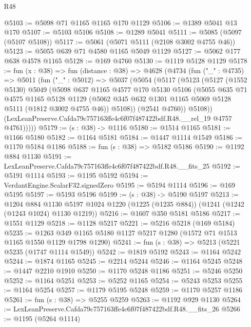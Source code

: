 \begin{lexlean}{R48}
\begin{coremodule}
@5103 := @5098 @71 @1165 @1165 @170 @1129
@5106 := @1389 @5041 @13 @170
@5107 := @5103 @5106
@5108 := @1289 @5041
@5111 := @5085 (@5097 (@5107 @5108))
@5117 := @5061 (@5071 @5111 (@2108 @3002 @4755 @46))
@5123 := @5055 @639 @71 @4580 @1165 @5049 @1129
@5127 := @5062 @177 @638 @4578 @1165
@5128 := @169 @4760
@5130 := @1119 @5128 @1129
@5178 := fun (x : @38) =>
  fun (distance : @38) =>
  @4628
    (@4734
      (fun ("_" : @4735) =>
      @5011
        (fun ("_" : @5012) =>
        @5037
          (@5054
            (@5117
              (@5123
                (@5127
                  (@1552 @5130)
                  @5049
                  (@5098
                    @637
                    @1165
                    @4577
                    @170
                    @5130
                    @5106
                    (@5055
                      @635
                      @71
                      @4575
                      @1165
                      @5128
                      @1129
                      (@5062 @345 @632 @1301 @1165 @5069 @5128 @5111 (@1812 @3002 @4755 @46))
                      @5108))
                  (@2541 @4760))
                @5108))
            (LexLeanPreserve.Cafda79c757163ffe4c6f07f487422bdf.R48.__rel_19 @4757 @4761)))))
@5179 := (s : @38) -> @1116
@5180 := @1514 @1165
@5181 := @1166 @5180
@5182 := @1164 @5181
@5184 := @1447 @1114 @1549
@5186 := @1170 @5184 @1186
@5188 := fun (s : @38) => @5182 @5186
@5190 := @1192 @884 @1130
@5191 := LexLeanPreserve.Cafda79c757163ffe4c6f07f487422bdf.R48.__fits_25
@5192 := @5191 @1114
@5193 := @1195 @5192
@5194 := VerdantEngine.ScalarF32.signedZero
@5195 := @5194 @1114
@5196 := @169 @5195
@5197 := @5193 @5196
@5199 := (s : @38) -> @5190 @5197
@5213 := @1204
    @884
    @1130
    @5197
    @1024
    @1220
    (@1225 (@1235 @884))
    (@1241 (@1242 (@1243 @1024) @1130 @1219))
@5216 := @1607 @350 @5181 @5186
@5217 := @1551 @1129
@5218 := @1128 @5217
@5221 := @5216 @5218 (@169 @5184)
@5235 := @1263 @349 @1165 @5180 @1127 @5217 @1280 (@1572 @71 @1513 @1165 @1550 @1129 @1798 @1290)
@5241 := fun (s : @38) => @5213 (@5221 @5235 (@1747 @1114 @1549))
@5242 := @1819 @5192
@5243 := @1164 @5242
@5244 := @1874 @1165
@5245 := @2214 @5244
@5246 := @1164 @5245
@5248 := @1447 @2210 @1910
@5250 := @1170 @5248 @1186
@5251 := @5246 @5250
@5252 := @1164 @5251
@5253 := @5252 @1165
@5254 := @5243 @5253
@5255 := @1164 @5254
@5257 := @1179 @5195 @5248
@5259 := @1170 @5257 @1186
@5261 := fun (s : @38) => @5255 @5259
@5263 := @1192 @929 @1130
@5264 := LexLeanPreserve.Cafda79c757163ffe4c6f07f487422bdf.R48.__fits_26
@5266 := @1195 (@5264 @1114)

\end{coremodule}
\end{lexlean}
